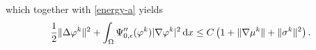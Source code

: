 \documentclass[11pt,reqno]{amsart}
\def\d{{\rm d}}
\def\n{{\bm{n}}}
\begin{document}
%
which together with \eqref{energy-a} yields
%
\begin{equation}
\label{phi-H2-est}
\frac12 \| \Delta \varphi^k\|^2  + \int_{\Omega}\Psi_{0,\epsilon}''(\varphi^k)|\nabla \varphi^k|^2 \, \d x
\leq
C \left( 1+ \| \nabla \mu^k\| + \|\sigma^k\|^2\right).
\end{equation}
%
%
\end{document}
